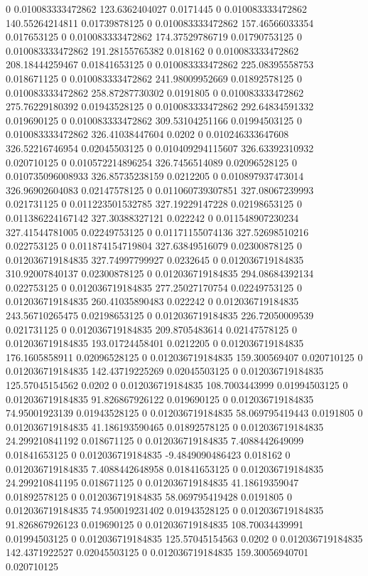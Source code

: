 0 0.010083333472862 123.6362404027 0.0171445
0 0.010083333472862 140.55264214811 0.01739878125
0 0.010083333472862 157.46566033354 0.017653125
0 0.010083333472862 174.37529786719 0.01790753125
0 0.010083333472862 191.28155765382 0.018162
0 0.010083333472862 208.18444259467 0.01841653125
0 0.010083333472862 225.08395558753 0.018671125
0 0.010083333472862 241.98009952669 0.01892578125
0 0.010083333472862 258.87287730302 0.0191805
0 0.010083333472862 275.76229180392 0.01943528125
0 0.010083333472862 292.64834591332 0.019690125
0 0.010083333472862 309.53104251166 0.01994503125
0 0.010083333472862 326.41038447604 0.0202
0 0.010246333647608 326.52216746954 0.02045503125
0 0.010409294115607 326.63392310932 0.020710125
0 0.010572214896254 326.7456514089 0.02096528125
0 0.010735096008933 326.85735238159 0.0212205
0 0.010897937473014 326.96902604083 0.02147578125
0 0.011060739307851 327.08067239993 0.021731125
0 0.011223501532785 327.19229147228 0.02198653125
0 0.011386224167142 327.30388327121 0.022242
0 0.011548907230234 327.41544781005 0.02249753125
0 0.01171155074136 327.52698510216 0.022753125
0 0.011874154719804 327.63849516079 0.02300878125
0 0.012036719184835 327.74997799927 0.0232645
0 0.012036719184835 310.92007840137 0.02300878125
0 0.012036719184835 294.08684392134 0.022753125
0 0.012036719184835 277.25027170754 0.02249753125
0 0.012036719184835 260.41035890483 0.022242
0 0.012036719184835 243.56710265475 0.02198653125
0 0.012036719184835 226.72050009539 0.021731125
0 0.012036719184835 209.8705483614 0.02147578125
0 0.012036719184835 193.01724458401 0.0212205
0 0.012036719184835 176.1605858911 0.02096528125
0 0.012036719184835 159.300569407 0.020710125
0 0.012036719184835 142.43719225269 0.02045503125
0 0.012036719184835 125.57045154562 0.0202
0 0.012036719184835 108.7003443999 0.01994503125
0 0.012036719184835 91.826867926122 0.019690125
0 0.012036719184835 74.95001923139 0.01943528125
0 0.012036719184835 58.069795419443 0.0191805
0 0.012036719184835 41.186193590465 0.01892578125
0 0.012036719184835 24.299210841192 0.018671125
0 0.012036719184835 7.4088442649099 0.01841653125
0 0.012036719184835 -9.4849090486423 0.018162
0 0.012036719184835 7.4088442648958 0.01841653125
0 0.012036719184835 24.299210841195 0.018671125
0 0.012036719184835 41.18619359047 0.01892578125
0 0.012036719184835 58.069795419428 0.0191805
0 0.012036719184835 74.950019231402 0.01943528125
0 0.012036719184835 91.826867926123 0.019690125
0 0.012036719184835 108.70034439991 0.01994503125
0 0.012036719184835 125.57045154563 0.0202
0 0.012036719184835 142.4371922527 0.02045503125
0 0.012036719184835 159.30056940701 0.020710125
